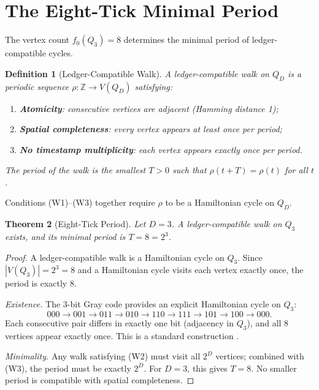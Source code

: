 \documentclass[11pt]{article}
\newtheorem{theorem}{Theorem}[section]
\newtheorem{definition}[theorem]{Definition}
\newcommand{\Z}{\mathbb{Z}}
\begin{document}
\section{The Eight-Tick Minimal Period}
\label{sec:eight_tick}

The vertex count $f_0(Q_3) = 8$ determines the minimal period of ledger-compatible cycles.

\begin{definition}[Ledger-Compatible Walk]\label{def:walk}
A \emph{ledger-compatible walk} on $Q_D$ is a periodic sequence $\rho : \Z \to V(Q_D)$ satisfying:
\begin{enumerate}[label=(W\arabic*)]
  \item \textbf{Atomicity}: consecutive vertices are adjacent (Hamming distance 1);
  \item \textbf{Spatial completeness}: every vertex appears at least once per period;
  \item \textbf{No timestamp multiplicity}: each vertex appears \emph{exactly once} per period.
\end{enumerate}
The \emph{period} of the walk is the smallest $T > 0$ such that $\rho(t + T) = \rho(t)$ for all $t$.
\end{definition}

Conditions (W1)--(W3) together require $\rho$ to be a Hamiltonian cycle on $Q_D$.

\begin{theorem}[Eight-Tick Period]\label{thm:eight_tick}
Let $D = 3$.
A ledger-compatible walk on $Q_3$ exists, and its minimal period is $T = 8 = 2^3$.
\end{theorem}

\begin{proof}
A ledger-compatible walk is a Hamiltonian cycle on $Q_3$.
Since $|V(Q_3)| = 2^3 = 8$ and a Hamiltonian cycle visits each vertex exactly once, the period is exactly $8$.

\emph{Existence.}
The 3-bit Gray code provides an explicit Hamiltonian cycle on $Q_3$:
\[
000 \to 001 \to 011 \to 010 \to 110 \to 111 \to 101 \to 100 \to 000.
\]
Each consecutive pair differs in exactly one bit (adjacency in $Q_3$), and all $8$ vertices appear exactly once.
This is a standard construction \cite{Savage1997Gray}.

\emph{Minimality.}
Any walk satisfying (W2) must visit all $2^D$ vertices; combined with (W3), the period must be exactly $2^D$.
For $D = 3$, this gives $T = 8$.
No smaller period is compatible with spatial completeness.
\end{proof}
\end{document}
